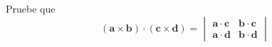 \item Pruebe que
    \[
    (\mathbf{a} \times \mathbf{b}) \cdot (\mathbf{c} \times \mathbf{d}) = \begin{vmatrix} \mathbf{a} \cdot \mathbf{c} & \mathbf{b} \cdot \mathbf{c} \\ \mathbf{a} \cdot \mathbf{d} & \mathbf{b} \cdot \mathbf{d} \end{vmatrix}
    \]
